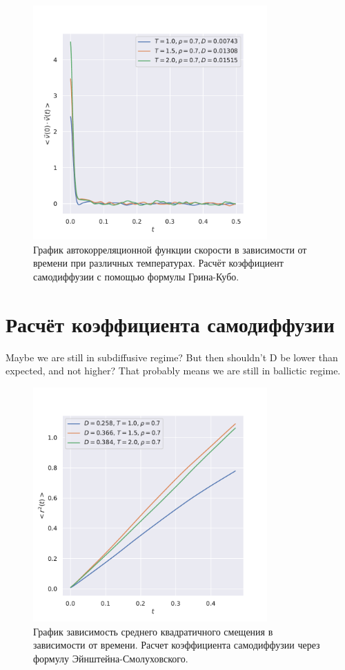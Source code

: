 \documentclass[a4paper,12pt]{article}
\begin{document}
\begin{figure}[H]
    \centering
    \includegraphics[width=0.8\textwidth]{../../media/vac.pdf}
\caption{График автокорреляционной функции
    скорости в зависимости от времени при различных
температурах. Расчёт коэффициент самодиффузии с
помощью формулы Грина-Кубо.}
\end{figure}

\section{Расчёт коэффициента самодиффузии}

{\color{red} Maybe we are still in subdiffusive regime?
But then shouldn't D be lower than expected, and not
higher? That probably means we are still in ballictic
regime.}

\begin{figure}[H]
    \centering
    \includegraphics[width=0.8\textwidth]{../../media/diffusion.pdf}
\caption{График зависимость среднего квадратичного
смещения в зависимости от времени. Расчет коэффициента
самодиффузии через формулу Эйнштейна-Смолуховского.}
\end{figure}
\end{document}
